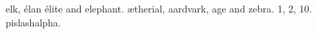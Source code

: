 \documentclass{article}
\begin{document}
\gls{elk}, \gls{élan} \gls{élite} and \gls{elephant}.
\gls{ætherial}, \gls{aardvark}, \gls{age} and \gls{zebra}.
\gls{1}, \gls{2}, \gls{10}.
\gls{pi}\gls{slash}\gls{alpha}.
\printnoidxglossary[type=index,sort=word]
\end{document}
